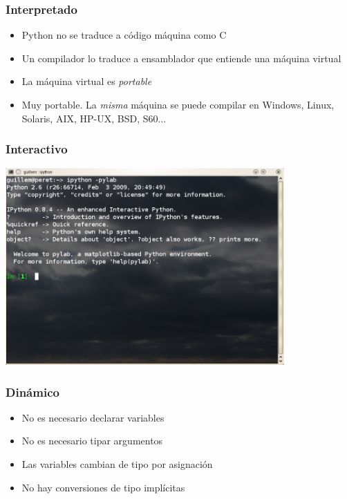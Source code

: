 \documentclass[12pt,mathserif,compress]{beamer}
\begin{document}
\begin{frame}
  \frametitle{Interpretado}
  \begin{itemize}
  \item Python no se traduce a código máquina como C 
  \item Un compilador lo traduce a ensamblador que entiende una
    máquina virtual
  \item La máquina virtual es \emph{portable}
\pause
\item Muy portable. La \emph{misma} máquina se puede compilar en \pause
  Windows, \pause Linux, \pause Solaris, \pause AIX, \pause HP-UX,
  \pause BSD, \pause S60...
  \end{itemize}
\end{frame}

\begin{frame}
  \frametitle{Interactivo}
  \begin{center}
  \includegraphics[width=0.8\textwidth]{files/interprete.png}    
  \end{center}
\end{frame}

\begin{frame}
  \frametitle{Dinámico}
  \begin{itemize}
  \item No es necesario declarar variables
  \item No es necesario tipar argumentos
  \item Las variables cambian de tipo por asignación
\pause
  \item No hay conversiones de tipo implícitas
  \end{itemize}
\testcode
\end{frame}
\end{document}
